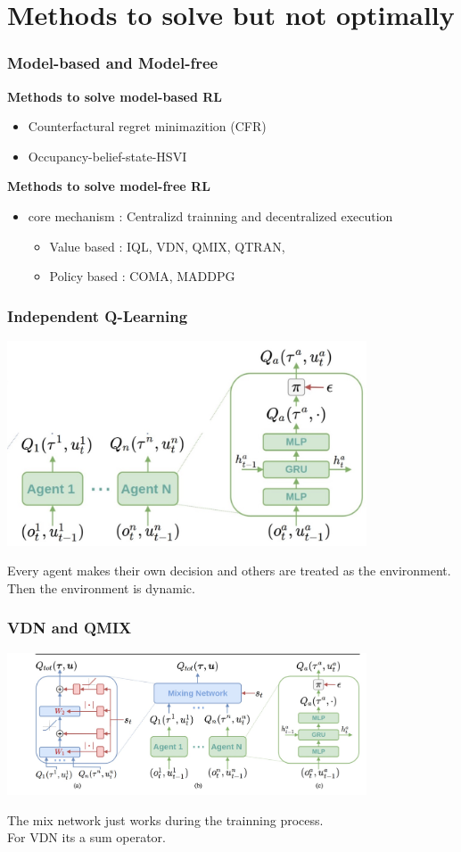 \documentclass[notheorems, aspectratio=54]{beamer}
\begin{document}
\section{Methods to solve but not optimally}
\begin{frame}
  \frametitle{Model-based and Model-free}
  \textbf{Methods to solve model-based RL}
  \begin{itemize}
    \item Counterfactural regret minimazition (CFR)
    \item Occupancy-belief-state-HSVI 
  \end{itemize}
  
  \textbf{Methods to solve model-free RL}
    \begin{itemize}
      \item[] core mechanism : Centralizd trainning and decentralized execution
      \begin{itemize}
        \item Value based : IQL, VDN, QMIX, QTRAN,  
        \item Policy based : COMA, MADDPG
      \end{itemize}
    \end{itemize}

\end{frame}

\begin{frame}
  \frametitle{Independent Q-Learning}
  \begin{center}
    \includegraphics[width=0.8\textwidth]{IQL.png}
  \end{center}
  Every agent makes their own decision and others are treated as the environment. Then the environment is dynamic.
\end{frame}

\begin{frame}
  \frametitle{VDN and QMIX}
  \begin{center}
    \includegraphics[width=0.8\textwidth]{QMIX.png}
  \end{center}
    The mix network just works during the trainning process.\\
    For VDN its a sum operator. \\
\end{frame}
\end{document}
